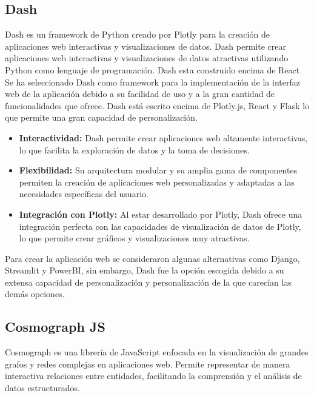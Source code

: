 \subsection{Dash}
Dash es un framework de Python creado por Plotly para la creación de aplicaciones web interactivas y visualizaciones de datos. Dash permite crear aplicaciones web interactivas y visualizaciones de datos atractivas utilizando Python como lenguaje de programación. Dash esta construido encima de React Se ha seleccionado Dash como framework para la implementación de la interfaz web de la aplicación debido a su facilidad de uso y a la gran cantidad de funcionalidades que ofrece. Dash está escrito encima de Plotly.js, React y Flask lo que permite una gran capacidad de personalización.

\begin{itemize}
	\item \textbf{Interactividad:} Dash permite crear aplicaciones web altamente interactivas, lo que facilita la exploración de datos y la toma de decisiones.
	\item \textbf{Flexibilidad:} Su arquitectura modular y su amplia gama de componentes permiten la creación de aplicaciones web personalizadas y adaptadas a las necesidades específicas del usuario.
	\item \textbf{Integración con Plotly:} Al estar desarrollado por Plotly, Dash ofrece una integración perfecta con las capacidades de visualización de datos de Plotly, lo que permite crear gráficos y visualizaciones muy atractivas.
\end{itemize}

Para crear la aplicación web se consideraron algunas alternativas como Django, Streamlit y PowerBI, sin embargo, Dash fue la opción escogida debido a su extensa capacidad de personalización y personalización de la que carecían las demás opciones.

\subsection{Cosmograph JS}

Cosmograph es una librería de JavaScript enfocada en la visualización de grandes grafos y redes complejas en aplicaciones web. Permite representar de manera interactiva relaciones entre entidades, facilitando la comprensión y el análisis de datos estructurados.

